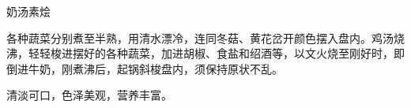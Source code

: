 \begin{recipe}{奶汤素烩}

\ingredients





\cooking

各种蔬菜分别煮至半熟，用清水漂冷，连同冬菇、黄花岔开颜色摆入盘内。鸡汤烧沸，轻轻梭进摆好的各种蔬菜，加进胡椒、食盐和绍酒等，以文火烧至刚好时，即倒进牛奶，刚煮沸后，起锅斜梭盘内，须保持原状不乱。

\notes

清淡可口，色泽美观，营养丰富。

\end{recipe}


